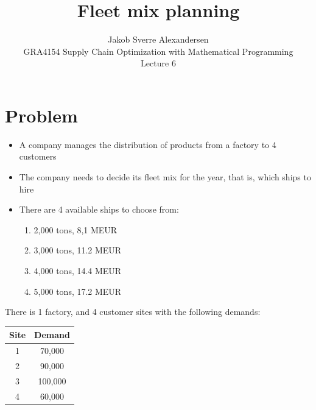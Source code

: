 \documentclass[10pt]{article}
\begin{document}
 
\title{Fleet mix planning}
\author{Jakob Sverre Alexandersen\\
GRA4154 Supply Chain Optimization with Mathematical Programming\\
Lecture 6}
\maketitle

\tableofcontents
\newpage

\section{Problem}

\begin{itemize}
    \item A company manages the distribution of products from a factory to 4 customers 
    \item The company needs to decide its fleet mix for the year, that is, which ships to hire 
    \item There are 4 available ships to choose from: 
    \begin{enumerate}
        \item 2,000 tons, 8,1 MEUR
        \item 3,000 tons, 11.2 MEUR
        \item 4,000 tons, 14.4 MEUR
        \item 5,000 tons, 17.2 MEUR
    \end{enumerate}
\end{itemize}

There is 1 factory, and 4 customer sites with the following demands: 
\begin{center}
    \begin{tabular}{|c|c|}
        \hline 
        \textbf{Site} & \textbf{Demand}\\\hline 
        1 & 70,000\\\hline
        2 & 90,000\\\hline
        3 & 100,000\\\hline
        4 & 60,000\\\hline
    \end{tabular}
\end{center}
\end{document}
